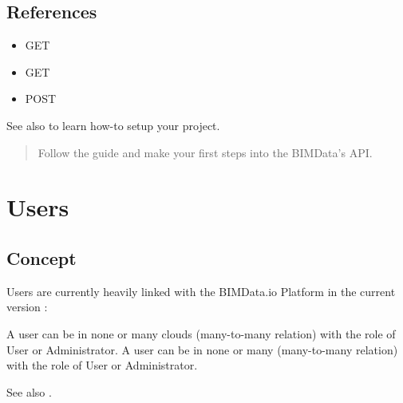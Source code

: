 \documentclass[a4paper,12pt,english]{sphinxmanual}
\begin{document}
\subsection{References}
\label{\detokenize{concepts/projects:references}}\begin{itemize}
\item {} 
GET 

\item {} 
GET 

\item {} 
POST 

\end{itemize}




See also {\hyperref[\detokenize{tutorials/getting_started::doc}]{}} to learn how-to setup your project.
\begin{quote}

Follow the guide and make your first steps into the BIMData’s API.
\end{quote}




\section{Users}
\label{\detokenize{concepts/users:users}}\label{\detokenize{concepts/users::doc}}

\subsection{Concept}
\label{\detokenize{concepts/users:concept}}
Users are currently heavily linked with the BIMData.io Platform in the current version : 

A user can be in none or many clouds (many-to-many relation) with the role of User or Administrator.
A user can be in none or many {\hyperref[\detokenize{concepts/projects::doc}]{}} (many-to-many relation) with the role of User or Administrator.




See also {\hyperref[\detokenize{guide/authentication_bimdata_connect::doc}]{}}.
\end{document}

